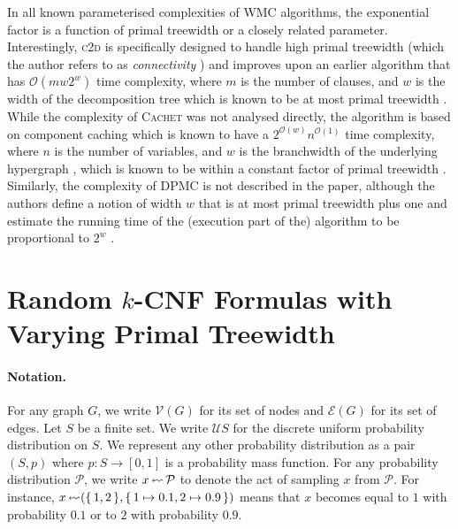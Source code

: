 In all known parameterised complexities of WMC algorithms, the exponential
factor is a function of primal treewidth or a closely related parameter.
Interestingly, \textsc{c2d} is specifically designed to handle high primal
treewidth (which the author refers to as \emph{connectivity}
\citep{DBLP:conf/ijcai/Darwiche99}) and improves upon an earlier algorithm that
has $\mathcal{O}(mw2^w)$ time complexity, where $m$ is the number of clauses,
and $w$ is the width of the decomposition tree which is known to be at most
primal treewidth
\citep{DBLP:journals/jacm/Darwiche01,DBLP:conf/ecai/Darwiche04}. While the
complexity of \textsc{Cachet} was not analysed directly, the algorithm is based
on component caching which is known to have a
$2^{\mathcal{O}(w)}n^{\mathcal{O}(1)}$ time complexity, where $n$ is the number
of variables, and $w$ is the branchwidth of the underlying hypergraph
\citep{DBLP:journals/jair/BacchusDP09,DBLP:conf/sat/SangBBKP04}, which is known
to be within a constant factor of primal treewidth
\citep{DBLP:journals/jct/RobertsonS91}. Similarly, the complexity of
\textsf{DPMC} is not described in the paper, although the authors define a
notion of width $w$ that is at most primal treewidth plus one and estimate the
running time of the (execution part of the) algorithm to be proportional to
$2^w$ \citep{DBLP:conf/cp/DudekPV20}.

\section{Random $k$-CNF Formulas with Varying Primal
  Treewidth}\label{sec:model}

\paragraph*{Notation.}
For any graph $G$, we write $\mathcal{V}(G)$ for its set of nodes and
$\mathcal{E}(G)$ for its set of edges. Let $S$ be a finite set. We write
$\mathcal{U}S$ for the discrete uniform probability distribution on $S$. We
represent any other probability distribution as a pair $(S, p)$ where $p\colon S
\to [0, 1]$ is a probability mass function. For any probability distribution
$\mathcal{P}$, we write $x \leftlsquigarrow \mathcal{P}$ to denote the act of
sampling $x$ from $\mathcal{P}$. For instance, $x \leftlsquigarrow (\{\, 1, 2 \,\}, \{\, 1 \mapsto 0.1, 2 \mapsto 0.9 \,\})$ means that $x$ becomes equal to $1$ with probability $0.1$ or to $2$ with probability $0.9$.


